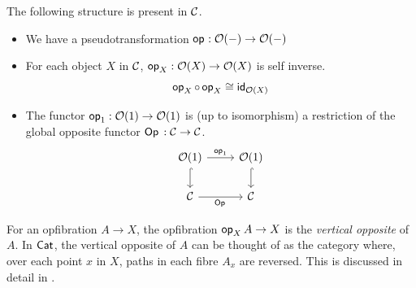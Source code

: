 \begin{axiom}\label{ax:local-op}
  The following structure is present in $\CC$.
  \begin{itemize}
    \item We have a pseudotransformation $\vOp{} : \opfibcart(-) \to \opfibcart(-)$ 
    \item For each object $X$ in $\CC$,
    $\vOp[X]{} : \opfibcart(X) \to \opfibcart(X)$ is self inverse.
    \[\vOp[X]{} \circ \vOp[X]{} \iso \id_{\opfibcart(X)}\]
    \item The functor $\vOp[1]{} : \opfibcart(1) \to \opfibcart(1)$
    is (up to isomorphism) a restriction of the global opposite functor
    $\Op{} : \CC \to \CC$.
    \[ \begin{tikzcd}
        {\opfibcart(1)} & {\opfibcart(1)} \\
        \CC & \CC
        \arrow["{{{\vOp[1]{}}}}", from=1-1, to=1-2]
        \arrow[hook, from=1-1, to=2-1]
        \arrow[hook, from=1-2, to=2-2]
        \arrow["{\Op{}}"', from=2-1, to=2-2]
      \end{tikzcd} \]
  \end{itemize}
\end{axiom}

For an opfibration $A \to X$, the opfibration $\vOp[X]{A} \to X$
is the \emph{vertical opposite} of $A$.
In $\Cat$, the vertical opposite of $A$ can be thought of as
the category where,
over each point $x$ in $X$,
paths in each fibre $A_x$ are reversed.
This is discussed in detail in .

